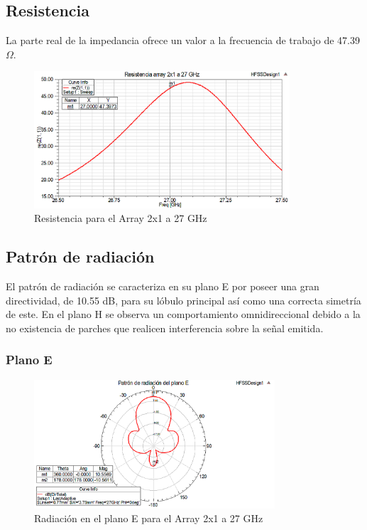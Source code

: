 \subsection{Resistencia}
\par La parte real de la impedancia ofrece un valor a la frecuencia de trabajo de 47.39 $\Omega$.
\\
\begin{figure}[H]
    \centering
        \includegraphics[width=0.85\textwidth]{archivos/analisis/2x13/3}
        \caption{Resistencia para el Array 2x1 a 27 GHz}
        \label{fig:resis2x13}
\end{figure}


\subsection{Patrón de radiación}
\par El patrón de radiación se caracteriza en su plano E por poseer una gran directividad, de 10.55 dB, para su lóbulo principal así como una correcta simetría de este. En el plano H se observa un comportamiento omnidireccional debido a la no existencia de parches que realicen interferencia sobre la señal emitida.
\\
\subsubsection{Plano E}
\begin{figure}[H]
    \centering
        \includegraphics[width=0.8\textwidth]{archivos/analisis/2x13/4}
        \caption{Radiación en el plano E para el Array 2x1 a 27 GHz}
        \label{fig:E2x13}
\end{figure}

